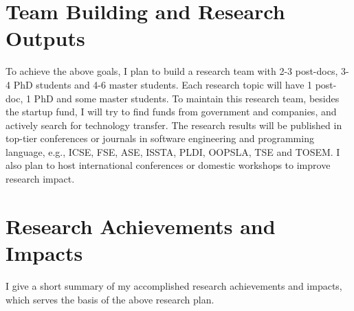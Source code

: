 \documentclass[a4paper]{article}
\begin{document}
\section{Team Building and Research Outputs}
To achieve the above goals, I plan to build a research team with 2-3 post-docs, 3-4 PhD students and 4-6 master students. Each research topic will have 1 post-doc, 1 PhD and some master students. To maintain this research team, besides the startup fund, I will try to find funds from government and companies, and actively search for technology transfer.
The research results will be published in top-tier conferences or journals in software engineering and programming language, e.g., ICSE, FSE, ASE, ISSTA, PLDI, OOPSLA, TSE and TOSEM.
I also plan to host international conferences or domestic workshops to improve research impact.

\section{Research Achievements and Impacts}

I give a short summary of my accomplished research achievements and impacts, which serves the basis of the above research plan.
\end{document}
